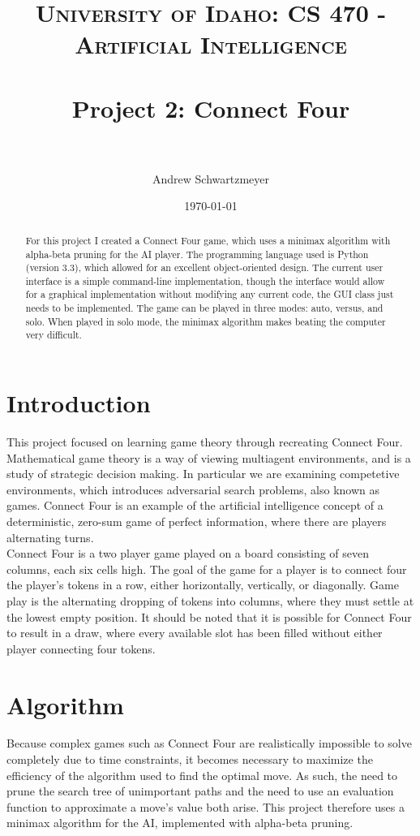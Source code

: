 \documentclass[12pt, article]{scrartcl}
\title{	
\normalfont \normalsize 
\textsc{University of Idaho: CS 470 - Artificial Intelligence} \\ [25pt]
\horrule{0.5pt} \\[0.4cm]
\huge Project 2: Connect Four\\
\horrule{2pt} \\[0.5cm]
}
\author{Andrew Schwartzmeyer}
\date{\normalsize\today}
\begin{document}
\maketitle 
\begin{abstract}
For this project I created a Connect Four game, which uses a minimax algorithm with alpha-beta pruning for the AI player. The programming language used is Python (version 3.3), which allowed for an excellent object-oriented design. The current user interface is a simple command-line implementation, though the interface would allow for a graphical implementation without modifying any current code, the GUI class just needs to be implemented. The game can be played in three modes: auto, versus, and solo. When played in solo mode, the minimax algorithm makes beating the computer very difficult.
\end{abstract}
\pagebreak
\section{Introduction}
This project focused on learning game theory through recreating Connect Four. Mathematical game theory is a way of viewing multiagent environments, and is a study of strategic decision making. In particular we are examining competetive environments, which introduces adversarial search problems, also known as games. Connect Four is an example of the artificial intelligence concept of a deterministic, zero-sum game of perfect information, where there are players alternating turns.
\\

Connect Four is a two player game played on a board consisting of seven columns, each six cells high. The goal of the game for a player is to connect four the player's tokens in a row, either horizontally, vertically, or diagonally. Game play is the alternating dropping of tokens into columns, where they must settle at the lowest empty position. It should be noted that it is possible for Connect Four to result in a draw, where every available slot has been filled without either player connecting four tokens.

\section{Algorithm}
Because complex games such as Connect Four are realistically impossible to solve completely due to time constraints, it becomes necessary to maximize the efficiency of the algorithm used to find the optimal move. As such, the need to prune the search tree of unimportant paths and the need to use an evaluation function to approximate a move's value both arise. This project therefore uses a minimax algorithm for the AI, implemented with alpha-beta pruning.
\end{document}
